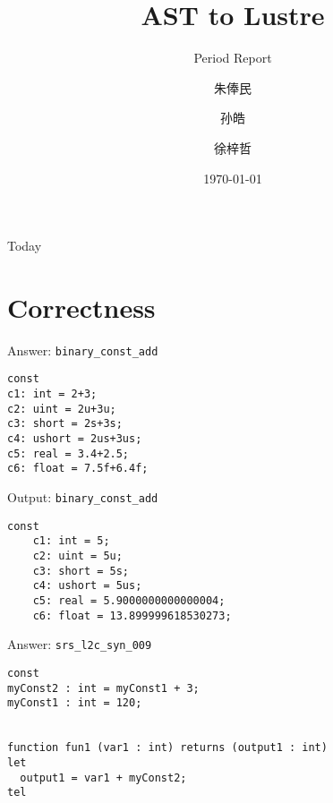 \documentclass{beamer}
\begin{document}
\title{AST to Lustre}
\subtitle{Period Report}
\author[Lambda]{朱俸民 \and 孙皓 \and 徐梓哲}
\date{\today}



\begin{frame}
    \titlepage
\end{frame}

\begin{frame}{Today}
    \tableofcontents
\end{frame}

\section{Correctness}

\begin{frame}[fragile]{Answer: \texttt{binary\_const\_add}}
    \begin{lstlisting}
const
c1: int = 2+3;
c2: uint = 2u+3u;
c3: short = 2s+3s;
c4: ushort = 2us+3us;
c5: real = 3.4+2.5;
c6: float = 7.5f+6.4f;
    \end{lstlisting}
\end{frame}

\begin{frame}[fragile]{Output: \texttt{binary\_const\_add}}
    \begin{lstlisting}
const
    c1: int = 5;
    c2: uint = 5u;
    c3: short = 5s;
    c4: ushort = 5us;
    c5: real = 5.9000000000000004;
    c6: float = 13.899999618530273;
    \end{lstlisting}
\end{frame}

\begin{frame}[fragile]{Answer: \texttt{srs\_l2c\_syn\_009}}
    \begin{lstlisting}
const
myConst2 : int = myConst1 + 3;
myConst1 : int = 120;


function fun1 (var1 : int) returns (output1 : int)
let
  output1 = var1 + myConst2;
tel
    \end{lstlisting}
\end{frame}
\end{document}

